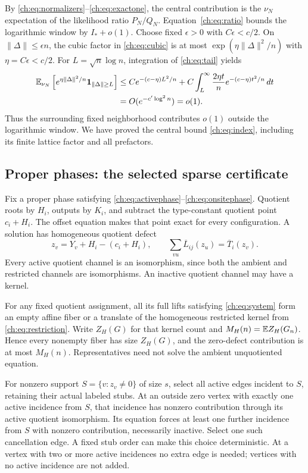 By \eqref{ch:eq:normalizers}--\eqref{ch:eq:exactone}, the central contribution is the $\nu_N$ expectation of the likelihood ratio $P_N/Q_N$. Equation~\eqref{ch:eq:ratio} bounds the logarithmic window by $I_*+o(1)$. Choose fixed $\epsilon>0$ with $C\epsilon<c/2$. On $\|\Delta\|\le\epsilon n$, the cubic factor in \eqref{ch:eq:cubic} is at most $\exp(\eta\|\Delta\|^2/n)$ with $\eta=C\epsilon<c/2$. For $L=\sqrt n\log n$, integration of \eqref{ch:eq:tail} yields
\begin{align*}
 \mathbb E_{\nu_N}\left[e^{\eta\|\Delta\|^2/n}\mathbf 1_{\|\Delta\|\ge L}\right]
 &\le Ce^{-(c-\eta)L^2/n}
 +C\int_L^\infty\frac{2\eta t}{n}e^{-(c-\eta)t^2/n}\,dt\\
 &=O(e^{-c'\log^2n})=o(1).
\end{align*}
Thus the surrounding fixed neighborhood contributes $o(1)$ outside the logarithmic window. We have proved the central bound \eqref{ch:eq:index}, including its finite lattice factor and all prefactors.

\subsection{Proper phases: the selected sparse certificate}
Fix a proper phase satisfying \eqref{ch:eq:activephase}--\eqref{ch:eq:onsitephase}. Quotient roots by $H_i$, outputs by $K_i$, and subtract the type-constant quotient point $c_i+H_i$. The offset equation makes that point exact for every configuration. A solution has homogeneous quotient defect
\begin{equation}\label{ch:eq:quotient}
 z_v=Y_v+H_i-(c_i+H_i),\qquad
 \sum_{vu}\overline L_{ij}(z_u)=\overline T_i(z_v).
\end{equation}
Every active quotient channel is an isomorphism, since both the ambient and restricted channels are isomorphisms. An inactive quotient channel may have a kernel.

For any fixed quotient assignment, all its full lifts satisfying \eqref{ch:eq:system} form an empty affine fiber or a translate of the homogeneous restricted kernel from \eqref{ch:eq:restriction}. Write $Z_H(G)$ for that kernel count and $M_H(n)=\mathbb E Z_H(G_n)$. Hence every nonempty fiber has size $Z_H(G)$, and the zero-defect contribution is at most $M_H(n)$. Representatives need not solve the ambient unquotiented equation.

For nonzero support $S=\{v:z_v\ne0\}$ of size $s$, select all active edges incident to $S$, retaining their actual labeled stubs. At an outside zero vertex with exactly one active incidence from $S$, that incidence has nonzero contribution through its active quotient isomorphism. Its equation forces at least one further incidence from $S$ with nonzero contribution, necessarily inactive. Select one such cancellation edge. A fixed stub order can make this choice deterministic. At a vertex with two or more active incidences no extra edge is needed; vertices with no active incidence are not added.


